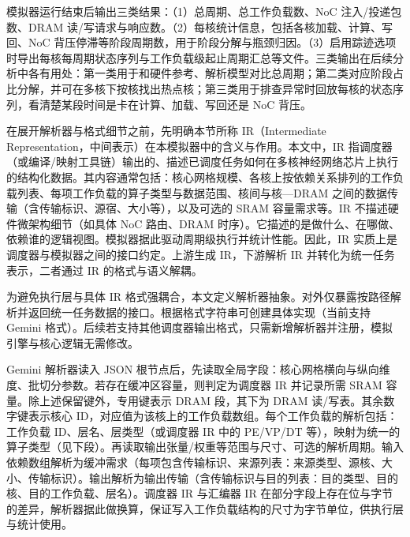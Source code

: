 模拟器运行结束后输出三类结果：（1）总周期、总工作负载数、NoC 注入/投递包数、DRAM 读/写请求与响应数。（2）每核统计信息，包括各核加载、计算、写回、NoC 背压停滞等阶段周期数，用于阶段分解与瓶颈归因。（3）启用踪迹选项时导出每核每周期状态序列与工作负载级起止周期汇总等文件。三类输出在后续分析中各有用处：第一类用于和硬件参考、解析模型对比总周期；第二类对应阶段占比分解，并可在多核下按核找出热点核；第三类用于排查异常时回放每核的状态序列，看清楚某段时间是卡在计算、加载、写回还是 NoC 背压。

\label{sec:c3_parse}


在展开解析器与格式细节之前，先明确本节所称 IR（Intermediate Representation，中间表示）在本模拟器中的含义与作用。本文中，IR 指调度器（或编译/映射工具链）输出的、描述已调度任务如何在多核神经网络芯片上执行的结构化数据。其内容通常包括：核心网格规模、各核上按依赖关系排列的工作负载列表、每项工作负载的算子类型与数据范围、核间与核—DRAM 之间的数据传输（含传输标识、源宿、大小等），以及可选的 SRAM 容量需求等。IR 不描述硬件微架构细节（如具体 NoC 路由、DRAM 时序）。它描述的是做什么、在哪做、依赖谁的逻辑视图。模拟器据此驱动周期级执行并统计性能。因此，IR 实质上是调度器与模拟器之间的接口约定。上游生成 IR，下游解析 IR 并转化为统一任务表示，二者通过 IR 的格式与语义解耦。


为避免执行层与具体 IR 格式强耦合，本文定义解析器抽象。对外仅暴露按路径解析并返回统一任务数据的接口。根据格式字符串可创建具体实现（当前支持 Gemini 格式）。后续若支持其他调度器输出格式，只需新增解析器并注册，模拟引擎与核心逻辑无需修改。

Gemini 解析器读入 JSON 根节点后，先读取全局字段：核心网格横向与纵向维度、批切分参数。若存在缓冲区容量，则判定为调度器 IR 并记录所需 SRAM 容量。除上述保留键外，专用键表示 DRAM 段，其下为 DRAM 读/写表。其余数字键表示核心 ID，对应值为该核上的工作负载数组。每个工作负载的解析包括：工作负载 ID、层名、层类型（或调度器 IR 中的 PE/VP/DT 等），映射为统一的算子类型（见下段）。再读取输出张量/权重等范围与尺寸、可选的解析周期。输入依赖数组解析为缓冲需求（每项包含传输标识、来源列表：来源类型、源核、大小、传输标识）。输出解析为输出传输（含传输标识与目的列表：目的类型、目的核、目的工作负载、层名）。调度器 IR 与汇编器 IR 在部分字段上存在位与字节的差异，解析器据此做换算，保证写入工作负载结构的尺寸为字节单位，供执行层与统计使用。

